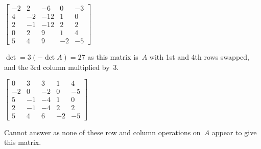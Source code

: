 \begin{example}
\begin{parts}
\item \(\begin{bmatrix}-2&2&-6&0&-3
\\4&-2&-12&1&0
\\2&-1&-12&2&2
\\0&2&9&1&4
\\5&4&9&-2&-5\end{bmatrix}\)
\begin{solution} 
\(\det=3(-\det A)=27\) as this matrix is~\(A\) with 1st and 4th rows swapped, and the 3rd column multiplied by~\(3\). 
\end{solution}

\item \(\begin{bmatrix}0&3&3&1&4
\\-2&0&-2&0&-5
\\5&-1&-4&1&0
\\2&-1&-4&2&2
\\5&4&6&-2&-5\end{bmatrix}\)
\begin{solution} 
Cannot answer as none of these row and column operations on~\(A\) appear to give this matrix.
\end{solution}

\end{parts}
\end{example}




